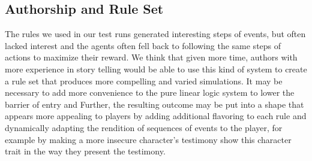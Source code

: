 \subsection{Authorship and Rule Set}
The rules we used in our test runs generated interesting steps of events, but often lacked interest and the agents often fell back to following the same steps of actions to maximize their reward.
We think that given more time, authors with more experience in story telling would be able to use this kind of system to create a rule set that produces more compelling and varied simulations.
It may be necessary to add more convenience to the pure linear logic system to lower the barrier of entry and 
Further, the resulting outcome may be put into a shape that appears more appealing to players by adding additional flavoring to each rule and dynamically adapting the rendition of sequences of events to the player, for example by making a more insecure character's testimony show this character trait in the way they present the testimony.

